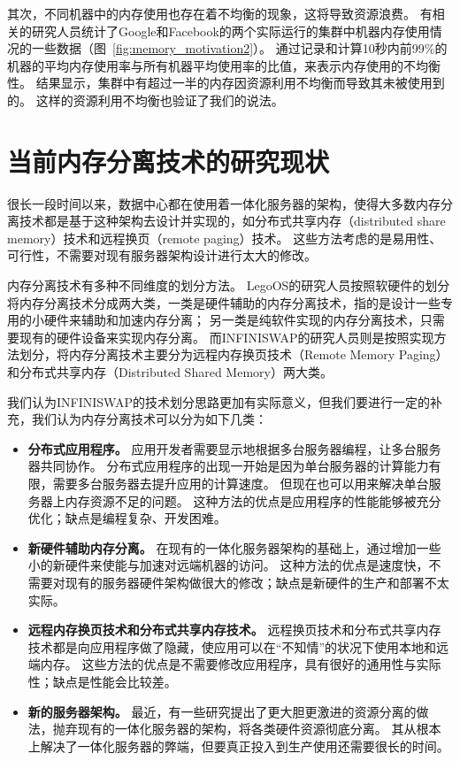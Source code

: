 其次，不同机器中的内存使用也存在着不均衡的现象，这将导致资源浪费。
有相关的研究人员统计了Google和Facebook的两个实际运行的集群中机器内存使用情况的一些数据（图~\ref{fig:memory_motivation2}）。
通过记录和计算10秒内前99\%的机器的平均内存使用率与所有机器平均使用率的比值，来表示内存使用的不均衡性。
结果显示，集群中有超过一半的内存因资源利用不均衡而导致其未被使用到的。
这样的资源利用不均衡也验证了我们的说法。



\section{当前内存分离技术的研究现状}

很长一段时间以来，数据中心都在使用着一体化服务器的架构，使得大多数内存分离技术都是基于这种架构去设计并实现的，如分布式共享内存（distributed share memory）技术和远程换页（remote paging）技术。
这些方法考虑的是易用性、可行性，不需要对现有服务器架构设计进行太大的修改。

内存分离技术有多种不同维度的划分方法。
LegoOS\cite{shan2018legoos}的研究人员按照软硬件的划分将内存分离技术分成两大类，一类是硬件辅助的内存分离技术，指的是设计一些专用的小硬件来辅助和加速内存分离；
另一类是纯软件实现的内存分离技术，只需要现有的硬件设备来实现内存分离。
而INFINISWAP的研究人员则是按照实现方法划分，将内存分离技术主要分为远程内存换页技术（Remote Memory Paging）和分布式共享内存（Distributed Shared Memory）两大类。

我们认为INFINISWAP的技术划分思路更加有实际意义，但我们要进行一定的补充，我们认为内存分离技术可以分为如下几类：

\begin{itemize}
\item \textbf{分布式应用程序。}
应用开发者需要显示地根据多台服务器编程，让多台服务器共同协作。
分布式应用程序的出现一开始是因为单台服务器的计算能力有限，需要多台服务器去提升应用的计算速度。
但现在也可以用来解决单台服务器上内存资源不足的问题。
这种方法的优点是应用程序的性能能够被充分优化；缺点是编程复杂、开发困难。

\item \textbf{新硬件辅助内存分离。}
在现有的一体化服务器架构的基础上，通过增加一些小的新硬件来使能与加速对远端机器的访问。
这种方法的优点是速度快，不需要对现有的服务器硬件架构做很大的修改；缺点是新硬件的生产和部署不太实际。

\item \textbf{远程内存换页技术和分布式共享内存技术。}
远程换页技术和分布式共享内存技术都是向应用程序做了隐藏，使应用可以在“不知情”的状况下使用本地和远端内存。
这些方法的优点是不需要修改应用程序，具有很好的通用性与实际性；缺点是性能会比较差。

\item \textbf{新的服务器架构。}
最近，有一些研究提出了更大胆更激进的资源分离的做法，抛弃现有的一体化服务器的架构，将各类硬件资源彻底分离。
其从根本上解决了一体化服务器的弊端，但要真正投入到生产使用还需要很长的时间。

\end{itemize}


